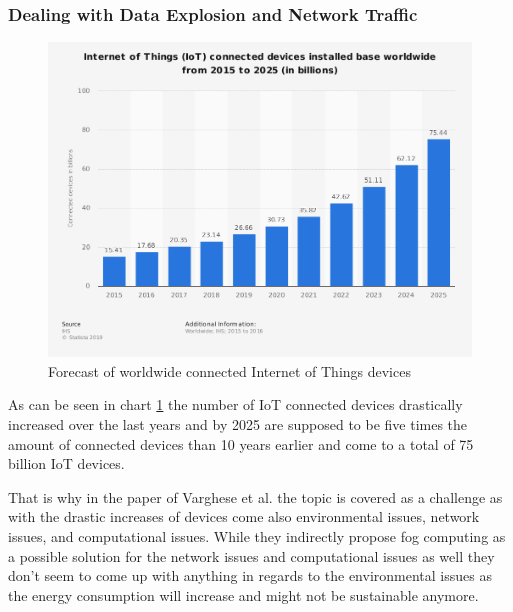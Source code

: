 \subsubsection{Dealing with Data Explosion and Network Traffic}\hspace*{\fill} \begin{figure}[h]
    \centering
    \includegraphics[width=1\textwidth,height=0.8\textwidth]{resources/images/global_iot_devices.png}
    \caption{Forecast of worldwide connected Internet of Things devices\cite{statista1}}
    \label{fig:global_iot_devices}
\end{figure}

As can be seen in chart \ref{fig:global_iot_devices} the number of IoT connected devices drastically increased over the last years and by 2025 are supposed to be five times the amount of connected devices than 10 years earlier and come to a total of 75 billion IoT devices.

That is why in the paper of Varghese et al. \cite{7796149} the topic is covered as a challenge as with the drastic increases of devices come also environmental issues, network issues, and computational issues.
While they indirectly propose fog computing as a possible solution for the network issues and computational issues as well they don’t seem to come up with anything in regards to the environmental issues as the energy consumption will increase and might not be sustainable anymore.

